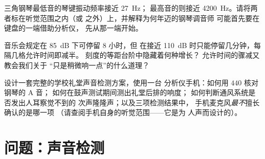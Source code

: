\begin{exercise}[$\star\star$]\label{exo:g8:sound-pitch-loudness:10}
三角钢琴最低音的琴键振动频率接近 \qty{27}{Hz}；
最高音的则接近 \qty{4200}{Hz}。请将两者标在听觉范围之内（或
之外）上，并解释为何年迈的钢琴调音师
可能首先要在键盘的一端借助分析仪，
先从那一端开始。
\end{exercise}

\begin{exercise}[$\star\star$]\label{exo:g8:sound-pitch-loudness:11}
音乐会规定在 \qty{85}{dB} 下可停留 $8$ 小时，但
在接近 \qty{110}{dB} 时只能停留几分钟，每隔几格允许时间即减半。
刻度的等距台阶中隐藏着何种增长？
允许时间的骤减又教会我们关于
“只是稍微响一点”的什么道理？
\end{exercise}

\begin{exercise}[$\star\star\star$]\label{exo:g8:sound-pitch-loudness:12}
设计一套完整的学校礼堂声音检测方案，使用一台
分析仪手机：如何用 $440$ 核对钢琴的 A 音；
如何在鼓声测试期间测出礼堂后排的响度；
如何判断通风系统是否发出人耳察觉不到的
次声隆隆声；以及三项检测结果中，
手机麦克风\emph{最不}擅长确认的是哪一项
（请查阅手机自身的听觉范围——它是为
人声而设计的）。
\end{exercise}

\section{问题：声音检测}

